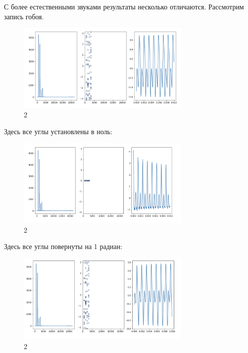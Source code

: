 \documentclass[10pt,a4paper,oneside]{article}
\begin{document}
С более естественными звуками результаты несколько отличаются. Рассмотрим запись гобоя.

\begin{figure}[H]
        \centering
        \includegraphics[width=0.75\textwidth]{pics/19.png}
        \caption{2}
        \label{fig:first}
\end{figure}

Здесь все углы установлены в ноль:

\begin{figure}[H]
        \centering
        \includegraphics[width=0.75\textwidth]{pics/20.png}
        \caption{2}
        \label{fig:first}
\end{figure}

Здесь все углы повернуты на 1 радиан: 

\begin{figure}[H]
        \centering
        \includegraphics[width=0.75\textwidth]{pics/21.png}
        \caption{2}
        \label{fig:first}
\end{figure}
\end{document}
